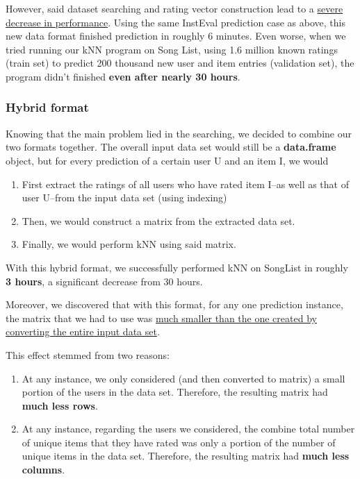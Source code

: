 \documentclass{article}
\begin{document}
However, said dataset searching and rating vector construction lead to a \underline{severe decrease in performance}. Using the same InstEval prediction case as above, this new data format finished prediction in roughly 6 minutes. Even worse, when we tried running our kNN program on Song List, using 1.6 million known ratings (train set) to predict 200 thousand new user and item entries (validation set), the program didn't finished \textbf{even after nearly 30 hours}.

\subsubsection{Hybrid format}

Knowing that the main problem lied in the searching, we decided to combine our two formats together. The overall input data set would still be a \textbf{data.frame} object, but for every prediction of a certain user U and an item I, we would

\begin{enumerate}
    \item First extract the ratings of all users who have rated item I--as well as that of user U--from the input data set (using indexing)
    \item Then, we would construct a matrix from the extracted data set.
    \item Finally, we would perform kNN using said matrix. 
\end{enumerate}

With this hybrid format, we successfully performed kNN on SongList in roughly \textbf{3 hours}, a significant decrease from 30 hours.

Moreover, we discovered that with this format, for any one prediction instance, the matrix that we had to use was \underline{much smaller than the one created by} \underline{converting the entire input data set}.

This effect stemmed from two reasons:

\begin{enumerate}
    \item At any instance, we only considered (and then converted to matrix) a small portion of the users in the data set. Therefore, the resulting matrix had \textbf{much less rows}.
    \item At any instance, regarding the users we considered, the combine total number of unique items that they have rated was only a portion of the number of unique items in the data set. Therefore, the resulting matrix had \textbf{much less columns}.
\end{enumerate}
\end{document}

